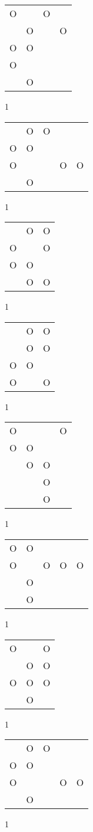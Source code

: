 \begin{tabular}{|m{0.2cm}m{0.2cm}m{0.2cm}m{0.2cm}|}\hline
O& &O& \\
 &O& &O\\
O&O& & \\
O& & & \\
 &O& & \\
\hline\end{tabular}1
\begin{tabular}{|m{0.2cm}m{0.2cm}m{0.2cm}m{0.2cm}m{0.2cm}|}\hline
 &O&O& & \\
O&O& & & \\
O& & &O&O\\
 &O& & & \\
\hline\end{tabular}1
\begin{tabular}{|m{0.2cm}m{0.2cm}m{0.2cm}|}\hline
 &O&O\\
O& &O\\
O&O& \\
 &O&O\\
\hline\end{tabular}1
\begin{tabular}{|m{0.2cm}m{0.2cm}m{0.2cm}|}\hline
 &O&O\\
 &O&O\\
O&O& \\
O& &O\\
\hline\end{tabular}1
\begin{tabular}{|m{0.2cm}m{0.2cm}m{0.2cm}m{0.2cm}|}\hline
O& & &O\\
O&O& & \\
 &O&O& \\
 & &O& \\
 & &O& \\
\hline\end{tabular}1
\begin{tabular}{|m{0.2cm}m{0.2cm}m{0.2cm}m{0.2cm}m{0.2cm}|}\hline
O&O& & & \\
O& &O&O&O\\
 &O& & & \\
 &O& & & \\
\hline\end{tabular}1
\begin{tabular}{|m{0.2cm}m{0.2cm}m{0.2cm}|}\hline
O& &O\\
 &O&O\\
O&O&O\\
 &O& \\
\hline\end{tabular}1
\begin{tabular}{|m{0.2cm}m{0.2cm}m{0.2cm}m{0.2cm}m{0.2cm}|}\hline
 &O&O& & \\
O&O& & & \\
O& & &O&O\\
 &O& & & \\
\hline\end{tabular}1

